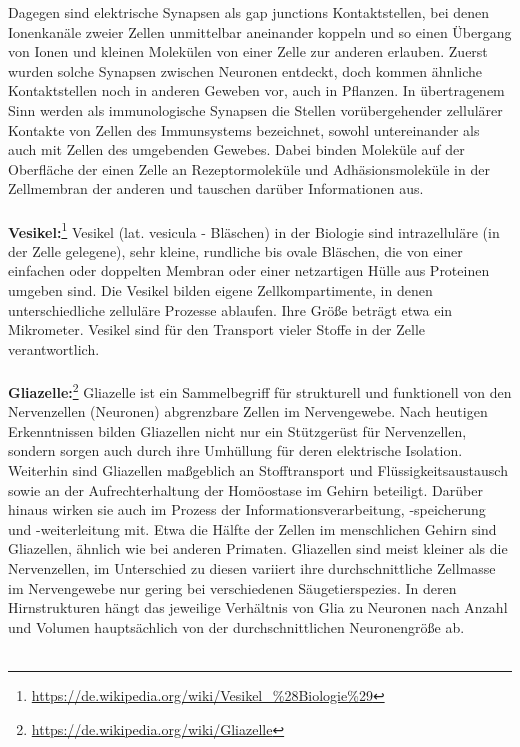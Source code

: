 Dagegen sind elektrische Synapsen als gap junctions Kontaktstellen, bei denen Ionenkanäle zweier Zellen unmittelbar aneinander koppeln und so einen Übergang von Ionen und kleinen Molekülen von einer Zelle zur anderen erlauben. Zuerst wurden solche Synapsen zwischen Neuronen entdeckt, doch kommen ähnliche Kontaktstellen noch in anderen Geweben vor, auch in Pflanzen.
In übertragenem Sinn werden als immunologische Synapsen die Stellen vorübergehender zellulärer Kontakte von Zellen des Immunsystems bezeichnet, sowohl untereinander als auch mit Zellen des umgebenden Gewebes. Dabei binden Moleküle auf der Oberfläche der einen Zelle an Rezeptormoleküle und Adhäsionsmoleküle in der Zellmembran der anderen und tauschen darüber Informationen aus.
\\\\
\textbf{Vesikel:}\footnote{\url{https://de.wikipedia.org/wiki/Vesikel_\%28Biologie\%29}} Vesikel (lat. vesicula - Bläschen) in der Biologie sind intrazelluläre (in der Zelle gelegene), sehr kleine, rundliche bis ovale Bläschen, die von einer einfachen oder doppelten Membran oder einer netzartigen Hülle aus Proteinen umgeben sind. Die Vesikel bilden eigene Zellkompartimente, in denen unterschiedliche zelluläre Prozesse ablaufen. Ihre Größe beträgt etwa ein Mikrometer. Vesikel sind für den Transport vieler Stoffe in der Zelle verantwortlich.
\\\\
\textbf{Gliazelle:}\footnote{\url{https://de.wikipedia.org/wiki/Gliazelle}} Gliazelle ist ein Sammelbegriff für strukturell und funktionell von den Nervenzellen (Neuronen) abgrenzbare Zellen im Nervengewebe. Nach heutigen Erkenntnissen bilden Gliazellen nicht nur ein Stützgerüst für Nervenzellen, sondern sorgen auch durch ihre Umhüllung für deren elektrische Isolation. Weiterhin sind Gliazellen maßgeblich an Stofftransport und Flüssigkeitsaustausch sowie an der Aufrechterhaltung der Homöostase im Gehirn beteiligt. Darüber hinaus wirken sie auch im Prozess der Informationsverarbeitung, -speicherung und -weiterleitung mit.
Etwa die Hälfte der Zellen im menschlichen Gehirn sind Gliazellen, ähnlich wie bei anderen Primaten. Gliazellen sind meist kleiner als die Nervenzellen, im Unterschied zu diesen variiert ihre durchschnittliche Zellmasse im Nervengewebe nur gering bei verschiedenen Säugetierspezies. In deren Hirnstrukturen hängt das jeweilige Verhältnis von Glia zu Neuronen nach Anzahl und Volumen hauptsächlich von der durchschnittlichen Neuronengröße ab.
\\\\
